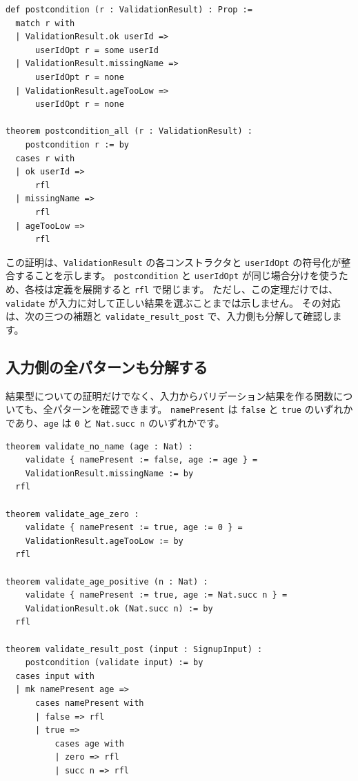 \begin{listing}[htbp]
\begin{verbatim}
def postcondition (r : ValidationResult) : Prop :=
  match r with
  | ValidationResult.ok userId =>
      userIdOpt r = some userId
  | ValidationResult.missingName =>
      userIdOpt r = none
  | ValidationResult.ageTooLow =>
      userIdOpt r = none

theorem postcondition_all (r : ValidationResult) :
    postcondition r := by
  cases r with
  | ok userId =>
      rfl
  | missingName =>
      rfl
  | ageTooLow =>
      rfl
\end{verbatim}
\caption{\texttt{postcondition\_all}}
\label{lst:ch19-postcondition}
\end{listing}

この証明は、\texttt{ValidationResult} の各コンストラクタと \texttt{userIdOpt} の符号化が整合することを示します。
\texttt{postcondition} と \texttt{userIdOpt} が同じ場合分けを使うため、各枝は定義を展開すると \texttt{rfl} で閉じます。
ただし、この定理だけでは、\texttt{validate} が入力に対して正しい結果を選ぶことまでは示しません。
その対応は、次の三つの補題と \texttt{validate\_result\_post} で、入力側も分解して確認します。

\subsection{入力側の全パターンも分解する}

結果型についての証明だけでなく、入力からバリデーション結果を作る関数についても、全パターンを確認できます。
\texttt{namePresent} は \texttt{false} と \texttt{true} のいずれかであり、\texttt{age} は \texttt{0} と \texttt{Nat.succ n} のいずれかです。

\begin{listing}[htbp]
\begin{verbatim}
theorem validate_no_name (age : Nat) :
    validate { namePresent := false, age := age } =
    ValidationResult.missingName := by
  rfl

theorem validate_age_zero :
    validate { namePresent := true, age := 0 } =
    ValidationResult.ageTooLow := by
  rfl

theorem validate_age_positive (n : Nat) :
    validate { namePresent := true, age := Nat.succ n } =
    ValidationResult.ok (Nat.succ n) := by
  rfl

theorem validate_result_post (input : SignupInput) :
    postcondition (validate input) := by
  cases input with
  | mk namePresent age =>
      cases namePresent with
      | false => rfl
      | true =>
          cases age with
          | zero => rfl
          | succ n => rfl
\end{verbatim}
\caption{\texttt{validate\_result\_post}}
\label{lst:ch19-validate-result-post}
\end{listing}

